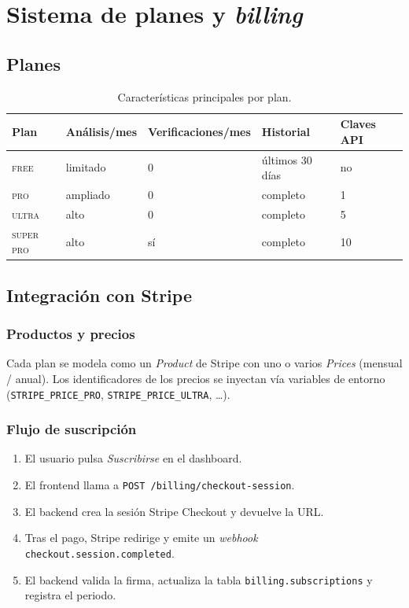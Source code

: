 \chapter{Sistema de planes y \emph{billing}}\label{cap:billing}

\section{Planes}

\begin{table}[h]
  \centering
  \begin{tabular}{lllll}
    \toprule
    Plan        & Análisis/mes & Verificaciones/mes & Historial & Claves API \\
    \midrule
    \textsc{free}      & limitado & 0  & últimos 30 días & no  \\
    \textsc{pro}       & ampliado & 0  & completo        & 1   \\
    \textsc{ultra}     & alto     & 0  & completo        & 5   \\
    \textsc{super pro} & alto     & sí & completo        & 10  \\
    \bottomrule
  \end{tabular}
  \caption{Características principales por plan.}
  \label{tab:planes}
\end{table}


\section{Integración con Stripe}

\subsection{Productos y precios}

Cada plan se modela como un \emph{Product} de Stripe con uno o varios
\emph{Prices} (mensual / anual). Los identificadores de los precios se
inyectan vía variables de entorno
(\texttt{STRIPE\_PRICE\_PRO}, \texttt{STRIPE\_PRICE\_ULTRA}, \dots).

\subsection{Flujo de suscripción}

\begin{enumerate}[leftmargin=*,itemsep=0.2em]
  \item El usuario pulsa \emph{Suscribirse} en el dashboard.
  \item El frontend llama a \texttt{POST /billing/checkout-session}.
  \item El backend crea la sesión Stripe Checkout y devuelve la URL.
  \item Tras el pago, Stripe redirige y emite un \emph{webhook}
        \texttt{checkout.session.completed}.
  \item El backend valida la firma, actualiza la tabla
        \texttt{billing.subscriptions} y registra el periodo.
\end{enumerate}

